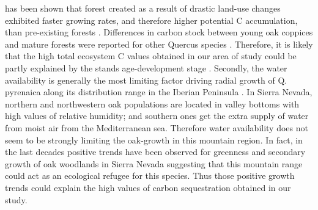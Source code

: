 has been shown that forest created as a result of drastic land-use changes exhibited faster growing rates, and therefore higher potential C accumulation, than pre-existing forests \autocite{VilaCabreraetal2017NewForests}. Differences in carbon stock between young oak coppices and mature forests were reported for other Quercus species \autocite{Bruckmanetal2011CarbonPools,Cotillasetal2016AbovegroundBelowground}. Therefore, it is likely that the high total ecosystem C values obtained in our area of study could be partly explained by the stands age-development stage \autocite{Makinecietal2015EcosystemCarbon}. Secondly, the water availability is generally the most limiting factor driving radial growth of Q. pyrenaica along its distribution range in the Iberian Peninsula \autocite{GeaIzquierdoCanellas2014LocalClimate}. In Sierra Nevada, northern and northwestern oak populations are located in valley bottoms with high values of relative humidity; and southern ones get the extra supply of water from moist air from the Mediterranean sea. Therefore water availability does not seem to be strongly limiting the oak-growth in this mountain region. In fact, in the last decades positive trends have been observed for greenness and secondary growth of oak woodlands in Sierra Nevada \autocite{GeaIzquierdoCanellas2014LocalClimate,PerezLuqueetal2020LanduseLegacies,RubioCuadradoetal2018AbioticFactors} suggesting that this mountain range could act as an ecological refugee for this species. Thus those positive growth trends could explain the high values of carbon sequestration obtained in our study.

